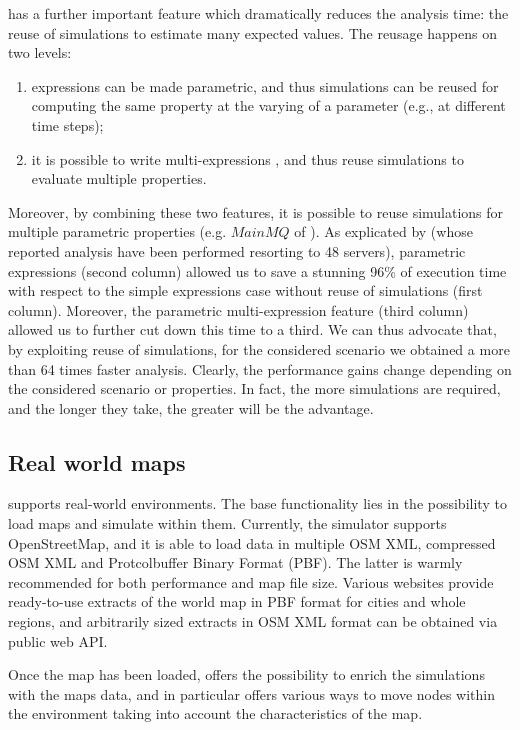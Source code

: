 \documentclass[12pt,a4paper,twoside,openright]{book}
\begin{document}
\multivesta{} has a further important feature which dramatically reduces the analysis time: the reuse of simulations to estimate many expected values. 
%
The reusage happens on two levels:
\begin{enumerate}
 \item expressions can be made parametric, and thus simulations can be reused for computing the same property at the varying of a parameter (e.g., at different time steps);
 \item it is possible to write multi-expressions , and thus reuse simulations to evaluate multiple properties.
\end{enumerate}
%
Moreover,  by combining these two features, it is possible to reuse simulations for multiple parametric properties (e.g. $MainMQ$ of ).
%
As explicated by  (whose reported analysis have been performed resorting to 48 servers), 	parametric expressions (second column) allowed us to save a stunning {%
96}\% of execution time with respect to the simple expressions case without reuse of simulations (first column). Moreover, the parametric multi-expression feature (third column) allowed us to further cut down this time to a third.
%
We can thus advocate that, by exploiting reuse of simulations, for the considered scenario we obtained a more than 64 times faster analysis.
%
Clearly, the performance gains change depending on the considered scenario or properties. In fact, the more simulations are required, and the longer they take, the greater will be the advantage.

\subsection{Real world maps}

\alchemist{} supports real-world environments.
%
The base functionality lies in the possibility to load maps and simulate within them.
%
Currently, the simulator supports OpenStreetMap\cite{osm}, and it is able to load data in multiple OSM XML, compressed OSM XML and Protcolbuffer Binary Format (PBF).
%
The latter is warmly recommended for both performance and map file size.
%
Various websites provide ready-to-use extracts of the world map in PBF format for cities and whole regions, and arbitrarily sized extracts in OSM XML format can be obtained via public web API.

Once the map has been loaded, \alchemist{} offers the possibility to enrich the simulations with the maps data, and in particular offers various ways to move nodes within the environment taking into account the characteristics of the map.
\end{document}
